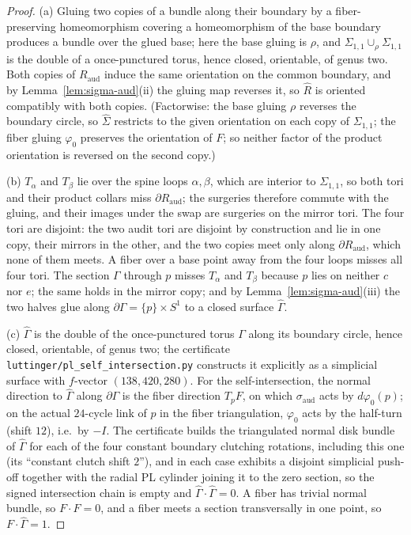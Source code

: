 \begin{proof}
(a) Gluing two copies of a bundle along their boundary by a
fiber-preserving homeomorphism covering a homeomorphism of the base
boundary produces a bundle over the glued base; here the base gluing is
$\rho$, and $\Sigma_{1,1}\cup_\rho\Sigma_{1,1}$ is the double of a
once-punctured torus, hence closed, orientable, of genus two.  Both
copies of $R_{\mathrm{aud}}$ induce the same orientation on the common
boundary, and by Lemma~\ref{lem:sigma-aud}(ii) the gluing map reverses
it, so $\hat R$ is oriented compatibly with both copies.  (Factorwise:
the base gluing $\rho$ reverses the boundary circle, so $\hat\Sigma$
restricts to the given orientation on each copy of $\Sigma_{1,1}$; the
fiber gluing $\varphi_0$ preserves the orientation of $F$; so neither
factor of the product orientation is reversed on the second copy.)

(b) $T_\alpha$ and $T_\beta$ lie over the spine loops $\alpha,\beta$,
which are interior to $\Sigma_{1,1}$, so both tori and their product
collars miss $\partial R_{\mathrm{aud}}$; the surgeries therefore commute
with the gluing, and their images under the swap are surgeries on the
mirror tori.  The four tori are disjoint: the two audit tori are disjoint
by construction and lie in one copy, their mirrors in the other, and the
two copies meet only along $\partial R_{\mathrm{aud}}$, which none of
them meets.  A fiber over a base point away from the four loops misses all
four tori.  The section $\Gamma$ through $p$ misses $T_\alpha$ and
$T_\beta$ because $p$ lies on neither $c$ nor $e$; the same holds in the
mirror copy; and by Lemma~\ref{lem:sigma-aud}(iii) the two halves glue
along $\partial\Gamma=\{p\}\times S^1$ to a closed surface $\hat\Gamma$.

(c) $\hat\Gamma$ is the double of the once-punctured torus $\Gamma$ along
its boundary circle, hence closed, orientable, of genus two; the
certificate \texttt{luttinger/pl\_self\_intersection.py} constructs it
explicitly as a simplicial surface with $f$-vector $(138,420,280)$.  For
the self-intersection, the normal direction to $\hat\Gamma$ along
$\partial\Gamma$ is the fiber direction $T_pF$, on which
$\sigma_{\mathrm{aud}}$ acts by $d\varphi_0(p)$; on the actual
$24$-cycle link of $p$ in the fiber triangulation, $\varphi_0$ acts by the
half-turn (shift $12$), i.e.\ by $-I$.  The certificate builds the
triangulated normal disk bundle of $\hat\Gamma$ for each of the four
constant boundary clutching rotations, including this one (its
``constant clutch shift $2$''), and in each case exhibits a disjoint
simplicial push-off together with the radial PL cylinder joining it to the
zero section, so the signed intersection chain is empty and
$\hat\Gamma\cdot\hat\Gamma=0$.  A fiber has trivial normal bundle, so
$F\cdot F=0$, and a fiber meets a section transversally in one point, so
$F\cdot\hat\Gamma=1$.
\end{proof}

